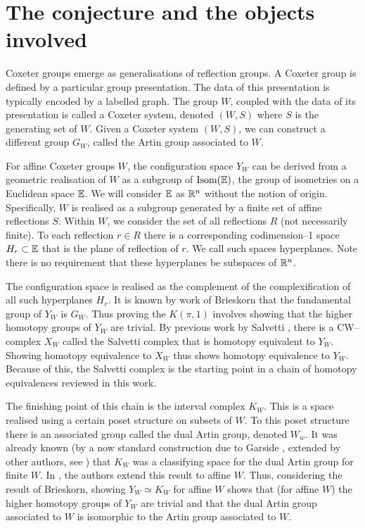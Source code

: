 \documentclass[class=guthesis, crop=false]{standalone}
\begin{document}
\section{The conjecture and the objects involved}
Coxeter groups emerge as generalisations of reflection groups. A Coxeter group is defined by a particular group presentation. The data of this presentation is typically encoded by a labelled graph. The group $W$, coupled with the data of its presentation is called a Coxeter system, denoted $(W,S)$ where $S$ is the generating set of $W$. Given a Coxeter system $(W,S)$, we can construct a different group $G_W$, called the Artin group associated to $W$.

For affine Coxeter groups $W$, the configuration space $Y_W$ can be derived from a geometric realisation of $W$ as a subgroup of $\operatorname{Isom}(\mathbb{E})$, the group of isometries on a Euclidean space $\mathbb{E}$. We will consider $\mathbb{E}$ as $\mathbb{R}^n$ without the notion of origin. Specifically, $W$ is realised as a subgroup generated by a finite set of affine reflections $S$. Within $W$, we consider the set of all reflections $R$ (not necessarily finite). To each reflection $r \in R$ there is a corresponding codimension--1 space $H_r \subset \mathbb{E}$ that is the plane of reflection of $r$. We call such spaces hyperplanes. Note there is no requirement that these hyperplanes be subspaces of $\mathbb{R}^n$.

The configuration space is realised as the complement of the complexification of all such hyperplanes $H_r$. It is known by work of Brieskorn \cite{brieskorn_fundamentalgruppe_1971} that the fundamental group of $Y_W$ is $G_W$. Thus proving the $K(\pi,1)$ involves showing that the higher homotopy groups of $Y_W$ are trivial. By previous work by Salvetti \cite{salvetti_topology_1987,salvetti_homotopy_1994}, there is a CW--complex $X_W$ called the Salvetti complex that is homotopy equivalent to $Y_W$. Showing homotopy equivalence to $X_W$ thus shows homotopy equivalence to $Y_W$. Because of this, the Salvetti complex is the starting point in a chain of homotopy equivalences reviewed in this work.

The finishing point of this chain is the interval complex $K_W$. This is a space realised using a certain poset structure on subsets of $W$. To this poset structure there is an associated group called the dual Artin group, denoted $W_w$. It was already known (by a now standard construction due to Garside \cite{garside_braid_1969}, extended by other authors, see \cite{charney_etal_bestvina_2002}) that $K_W$ was a classifying space for the dual Artin group for finite $W$. In \cite{paolini_salvetti_kpi1_2021}, the authors extend this result to affine $W$. Thus, considering the result of Brieskorn, showing $Y_W \simeq K_W$ for affine $W$ shows that (for affine $W$) the higher homotopy groups of $Y_W$ are trivial and that the dual Artin group associated to $W$ is isomorphic to the Artin group associated to $W$.
\end{document}

